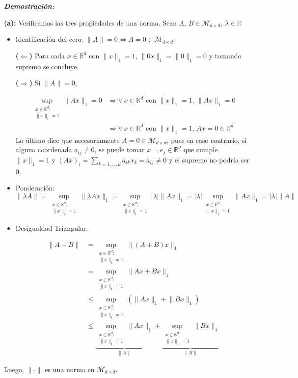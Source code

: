 \documentclass[letterpaper]{article}
\newcommand{\ssi}{\Longleftrightarrow}
\newcommand{\imp}{\Longrightarrow}
\newcommand{\pmi}{\Longleftarrow}
\newcommand{\R}{\mathbb{R}}
\newcommand{\dem}{\textbf{\emph{Demostraci\'on: }}}
\newcommand{\norm}[1]{\lVert #1\rVert }
\newcommand{\vabs}[1]{\lvert #1\rvert}
\begin{document}
\begin{enumerate}
\dem

\textbf{(a):} Verificamos las tres propiedades de una norma. Sean $A,\, B\in\mathcal{M}_{d\times d},\, \lambda\in\R$
\begin{itemize}
    \item Identificación del cero: $\norm{A}=0\ssi A=0\in\mathcal{M}_{d\times d}$.
    
    \textbf{($\pmi$)} Para cada $x\in\R^d$ con $\norm{x}_1=1$, $\norm{0x}_1=\norm{0}_1=0$ y tomando supremo se concluye.
    
    \textbf{($\imp$)} Si $\norm{A}=0$,
    
    \begin{align*}
    \sup_{\substack{x\in\R^d :\\
                  \norm{x}_1=1}}\norm{Ax}_1=0 &\imp \forall\,x\in\R^d \mbox{ con } \norm{x}_1=1,\, \norm{Ax}_1=0\\
               &\imp
                  \forall\,x\in\R^d \mbox{ con } \norm{x}_1=1,\, Ax=0 \in \R^d
    \end{align*}
    Lo último dice que necesariamente $A=0\in\mathcal{M}_{d\times d}$, pues en caso contrario, si alguna coordenada $a_{ij}\neq0$, se puede tomar $x=e_j\in\R^d$ que cumple $\norm{x}_1=1$ y $(Ax)_i=\sum_{k=1,\ldots,d}a_{ik}x_k=a_{ij}\neq0$ y el supremo no podría ser 0.
    
    \item Ponderación: 
    \[\norm{\lambda A}=\sup_{\substack{x\in\R^d :\\
                  \norm{x}_1=1}}\norm{\lambda Ax}_1=\sup_{\substack{x\in\R^d :\\
                  \norm{x}_1=1}}\vabs{\lambda}\norm{Ax}_1=
                  \vabs{\lambda}\sup_{\substack{x\in\R^d :\\
                  \norm{x}_1=1}}\norm{Ax}_1=\vabs{\lambda}\norm{A}\]
                  
    \item Desigualdad Triangular: 
    
    \begin{align*}
        \norm{A+B}&=\sup_{\substack{x\in\R^d :\\
                  \norm{x}_1=1}}\norm{(A+B)x}_1\\
              &=
               \sup_{\substack{x\in\R^d :\\
                  \norm{x}_1=1}}\norm{Ax+Bx}_1\\
              &\leq
                \sup_{\substack{x\in\R^d :\\
                  \norm{x}_1=1}}(\norm{Ax}_1+\norm{Bx}_1)\\
              &\leq
                  \underbrace{\sup_{\substack{x\in\R^d :\\
                 \norm{x}_1=1}}\norm{Ax}_1}_{\norm{A}}+
                 \underbrace{\sup_{\substack{x\in\R^d :\\
                  \norm{x}_1=1}}\norm{Bx}_1}_{\norm{B}}
    \end{align*}
\end{itemize}
Luego, $\norm{\cdot}$ es una norma en $\mathcal{M}_{d\times d}$.
    

\end{enumerate}
\end{document}
